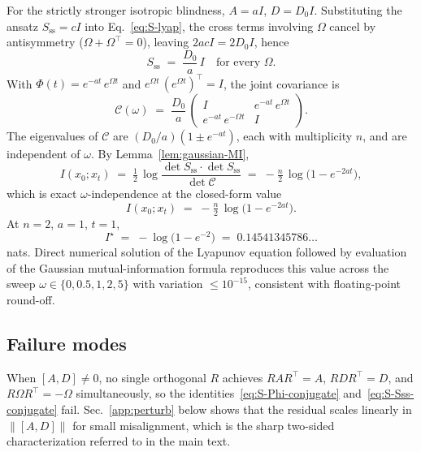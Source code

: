\documentclass[%
 reprint,
 superscriptaddress,
 nofootinbib,
 nobibnotes,
 amsmath,amssymb,
 aps,
 prl,
 floatfix,
]{revtex4-2}
\newcommand{\Sss}{S_{\mathrm{ss}}}
\newcommand{\Ie}{I^{\!\star}}
\begin{document}
For the strictly stronger isotropic blindness, $A = a I$, $D = D_0 I$. Substituting the ansatz $\Sss = c I$ into Eq.~\eqref{eq:S-lyap}, the cross terms involving $\Omega$ cancel by antisymmetry ($\Omega + \Omega^\top = 0$), leaving $2 a c I = 2 D_0 I$, hence
\begin{equation}\label{eq:S-Sss-iso}
\Sss \;=\; \frac{D_0}{a}\,I \quad \text{for every } \Omega.
\end{equation}
With $\Phi(t) = e^{-a t}\,e^{\Omega t}$ and $e^{\Omega t}\,(e^{\Omega t})^\top = I$, the joint covariance is
\[
\mathcal C(\omega) \;=\; \frac{D_0}{a}\,\begin{pmatrix} I & e^{-a t}\,e^{\Omega t} \\ e^{-a t}\,e^{-\Omega t} & I \end{pmatrix}.
\]
The eigenvalues of $\mathcal C$ are $(D_0/a)(1 \pm e^{-a t})$, each with multiplicity $n$, and are independent of $\omega$. By Lemma~\ref{lem:gaussian-MI},
\[
I(x_0; x_t) \;=\; \tfrac{1}{2}\,\log\!\frac{\det \Sss \cdot \det \Sss}{\det \mathcal C} \;=\; -\tfrac{n}{2}\,\log\bigl(1 - e^{-2 a t}\bigr),
\]
which is exact $\omega$-independence at the closed-form value
\begin{equation}\label{eq:S-MI-iso}
I(x_0; x_t) \;=\; -\tfrac{n}{2}\,\log\bigl(1 - e^{-2 a t}\bigr).
\end{equation}
At $n = 2$, $a = 1$, $t = 1$,
\begin{equation}\label{eq:S-anchor}
\Ie \;=\; -\log\bigl(1 - e^{-2}\bigr) \;=\; 0.14541345786\ldots
\end{equation}
nats. Direct numerical solution of the Lyapunov equation followed by evaluation of the Gaussian mutual-information formula reproduces this value across the sweep $\omega \in \{0, 0.5, 1, 2, 5\}$ with variation $\le 10^{-15}$, consistent with floating-point round-off.

\subsection{Failure modes}\label{app:fail}

When $[A,D] \neq 0$, no single orthogonal $R$ achieves $R A R^\top = A$, $R D R^\top = D$, and $R \Omega R^\top = -\Omega$ simultaneously, so the identities~\eqref{eq:S-Phi-conjugate} and~\eqref{eq:S-Sss-conjugate} fail. Sec.~\ref{app:perturb} below shows that the residual scales linearly in $\|[A,D]\|$ for small misalignment, which is the sharp two-sided characterization referred to in the main text.
\end{document}
